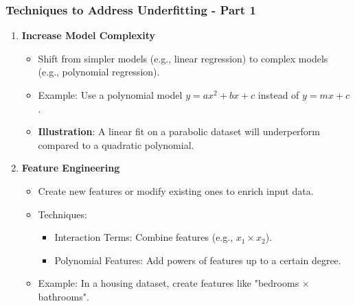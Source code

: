 \documentclass[aspectratio=169]{beamer}
\begin{document}
\begin{frame}[fragile]
    \frametitle{Techniques to Address Underfitting - Part 1}
    \begin{enumerate}
        \item \textbf{Increase Model Complexity}
            \begin{itemize}
                \item Shift from simpler models (e.g., linear regression) to complex models (e.g., polynomial regression).
                \item Example: Use a polynomial model $y = ax^2 + bx + c$ instead of $y = mx + c$.
                \item \textbf{Illustration}: A linear fit on a parabolic dataset will underperform compared to a quadratic polynomial.
            \end{itemize}
        
        \item \textbf{Feature Engineering}
            \begin{itemize}
                \item Create new features or modify existing ones to enrich input data.
                \item Techniques:
                    \begin{itemize}
                        \item Interaction Terms: Combine features (e.g., $x_1 \times x_2$).
                        \item Polynomial Features: Add powers of features up to a certain degree.
                    \end{itemize}
                \item Example: In a housing dataset, create features like "bedrooms $\times$ bathrooms".
            \end{itemize}
    \end{enumerate}
\end{frame}
\end{document}
